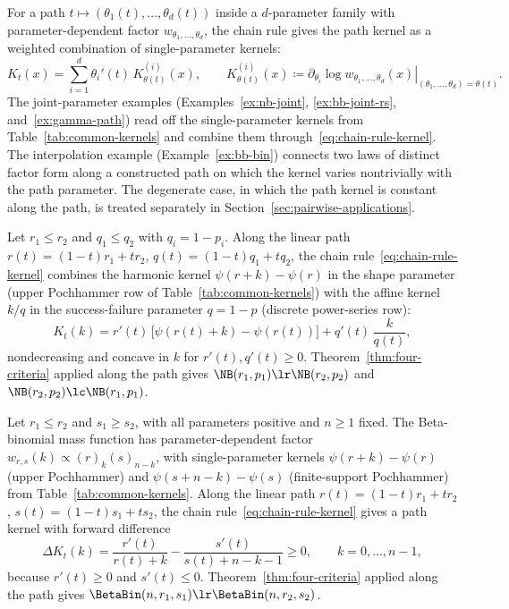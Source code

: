 \documentclass[11pt]{article}
\begin{document}
For a path \(t\mapsto(\theta_1(t),\dots,\theta_d(t))\) inside a $d$-parameter family with parameter-dependent factor \(w_{\theta_1,\dots,\theta_d}\), the chain rule gives the path kernel as a weighted combination of single-parameter kernels:
\begin{equation}\label{eq:chain-rule-kernel}
K_t(x)=\sum_{i=1}^{d}\theta_i'(t)\,K^{(i)}_{\theta(t)}(x),
\qquad K^{(i)}_{\theta(t)}(x)\coloneqq
\left.\partial_{\theta_i}\log w_{\theta_1,\dots,\theta_d}(x)\right|_{(\theta_1,\dots,\theta_d)=\theta(t)}.
\end{equation}
The joint-parameter examples (Examples~\ref{ex:nb-joint}, \ref{ex:bb-joint-rs}, and~\ref{ex:gamma-path}) read off the single-parameter kernels from Table~\ref{tab:common-kernels} and combine them through~\eqref{eq:chain-rule-kernel}. The interpolation example (Example~\ref{ex:bb-bin}) connects two laws of distinct factor form along a constructed path on which the kernel varies nontrivially with the path parameter. The degenerate case, in which the path kernel is constant along the path, is treated separately in Section~\ref{sec:pairwise-applications}.

\begin{example}
\label{ex:nb-joint}
Let \(r_1\le r_2\) and \(q_1\le q_2\) with \(q_i=1-p_i\). Along the linear path \(r(t)=(1-t)r_1+tr_2\), \(q(t)=(1-t)q_1+tq_2\), the chain rule~\eqref{eq:chain-rule-kernel} combines the harmonic kernel \(\psi(r+k)-\psi(r)\) in the shape parameter (upper Pochhammer row of Table~\ref{tab:common-kernels}) with the affine kernel \(k/q\) in the success-failure parameter \(q=1-p\) (discrete power-series row):
\[
K_t(k)
=r'(t)\,\bigl[\psi(r(t)+k)-\psi(r(t))\bigr]
+q'(t)\,\frac{k}{q(t)},
\]
nondecreasing and concave in \(k\) for \(r'(t),q'(t)\ge 0\). Theorem~\ref{thm:four-criteria} applied along the path gives \(\NB(r_1,p_1)\lr\NB(r_2,p_2)\) and \(\NB(r_2,p_2)\lc\NB(r_1,p_1)\).
\end{example}

\begin{example}
\label{ex:bb-joint-rs}
Let \(r_1\le r_2\) and \(s_1\ge s_2\), with all parameters positive and \(n\ge 1\) fixed. The Beta-binomial mass function has parameter-dependent factor \(w_{r,s}(k)\propto(r)_k(s)_{n-k}\), with single-parameter kernels \(\psi(r+k)-\psi(r)\) (upper Pochhammer) and \(\psi(s+n-k)-\psi(s)\) (finite-support Pochhammer) from Table~\ref{tab:common-kernels}. Along the linear path \(r(t)=(1-t)r_1+tr_2\), \(s(t)=(1-t)s_1+ts_2\), the chain rule~\eqref{eq:chain-rule-kernel} gives a path kernel with forward difference
\[
\Delta K_t(k)
=\frac{r'(t)}{r(t)+k}-\frac{s'(t)}{s(t)+n-k-1}\ge 0,
\qquad k=0,\dots,n-1,
\]
because \(r'(t)\ge 0\) and \(s'(t)\le 0\). Theorem~\ref{thm:four-criteria} applied along the path gives \(\BetaBin(n,r_1,s_1)\lr\BetaBin(n,r_2,s_2)\).
\end{example}
\end{document}
